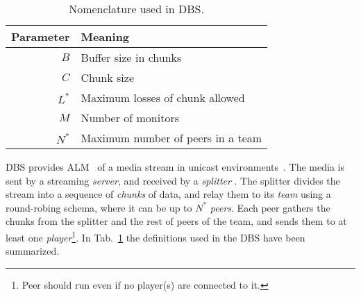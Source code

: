 
\label{sec:DBS}

\begin{table}
  \begin{tabular}{rl}
    Parameter & Meaning \\
    \hline
    $B$    & Buffer size in chunks \\
    $C$    & Chunk size \\
    $L^*$  & Maximum losses of chunk allowed \\
    $M$    & Number of monitors \\
    $N^*$  & Maximum number of peers in a team
  \end{tabular}
  \caption{Nomenclature used in DBS.\label{tab:DBS_nomenclature}}
\end{table}

DBS provides ALM~\cite{banerjee2002scalable} of a media stream in
unicast environments~\cite{comer2003computer}. The media is sent by a
streaming \emph{server}, and received by a \emph{splitter} . The splitter divides the stream into a
sequence of \emph{chunks} of data, and relay them to its \emph{team}
using a round-robing schema, where it can be up to $N^*$
\emph{peers}. Each peer gathers the chunks from the splitter and the
rest of peers of the team, and sends them to at least one
\emph{player}\footnote{Peer should run even if no player(s) are
  connected to it.}. In Tab.~\ref{tab:DBS_nomenclature} the
definitions used in the DBS have been summarized.

\begin{comment}
In single layered streams\footnote{Each layer of a
  scalable stream is received by a different peer attached to the same
  player capable or render scalable media.}, each peer is spawned by a
player (normal users should not run peers directly).
\end{comment}

\begin{comment}
/* quitar: We define the set of teams as
$\{T\}$,
and enumerate the peers in the team $T$ as $T=\{P_1,\cdots,P_{|T|}\}$. */
\end{comment}
